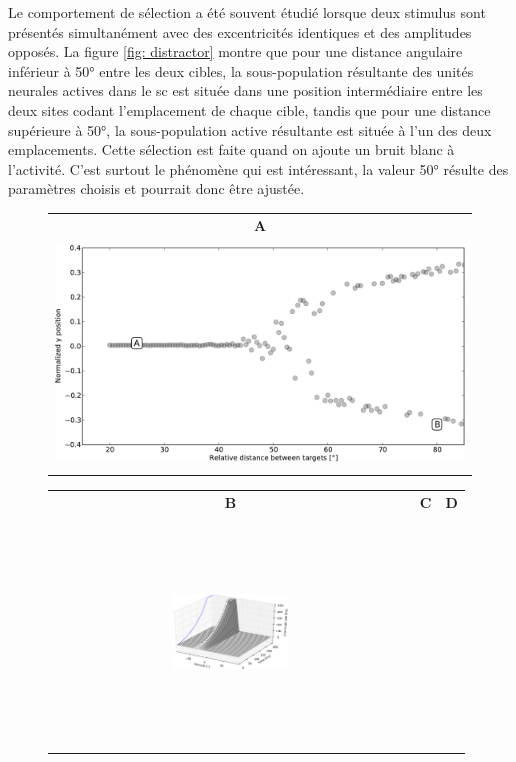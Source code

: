 Le comportement de sélection a été souvent étudié lorsque deux stimulus sont présentés simultanément avec des excentricités identiques et des amplitudes opposés. La figure \ref{fig: distractor} montre que pour une distance angulaire inférieur à 50° entre les deux cibles, la sous-population résultante des unités neurales actives dans le \gls{sc} est située dans une position intermédiaire entre les deux sites codant l'emplacement de chaque cible, tandis que pour une distance supérieure à 50°, la sous-population active résultante est située à l'un des deux emplacements. Cette sélection est faite quand on ajoute un bruit blanc à l'activité. C'est surtout le phénomène qui est intéressant, la valeur 50° résulte des paramètres choisis et pourrait donc être ajustée.\\

\begin{figure}
  \begin{center}
    \begin{tabular}[t]{c}
     {\textsf {\textbf A}}  \\
      \includegraphics[height=6cm]{figures/ch3_9_global-effect}  \\
    \end{tabular}
    \begin{tabular}[t]{ccc}
      {\textsf {\textbf B}} &
      {\textsf {\textbf C}} &
      {\textsf {\textbf D}} \\     
      \includegraphics[width=0.33\textwidth, height=6cm]{figures/ch3_9_distractor-effect-1} &

\end{tabular}
\end{center}
\end{figure}
